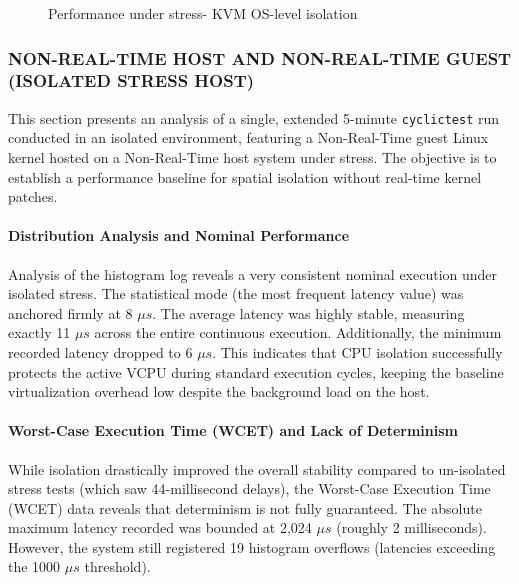 \begin{figure}
\centering

\caption{Performance under stress- KVM OS-level isolation}
\end{figure}

\subsubsection{NON-REAL-TIME HOST AND NON-REAL-TIME GUEST (ISOLATED
STRESS
HOST)}\label{non-real-time-host-and-non-real-time-guest-isolated-stress-host}

This section presents an analysis of a single, extended 5-minute
\texttt{cyclictest} run conducted in an isolated environment, featuring
a Non-Real-Time guest Linux kernel hosted on a Non-Real-Time host system
under stress. The objective is to establish a performance baseline for
spatial isolation without real-time kernel patches.

\paragraph{Distribution Analysis and Nominal
Performance}\label{distribution-analysis-and-nominal-performance-3}

Analysis of the histogram log reveals a very consistent nominal
execution under isolated stress. The statistical mode (the most frequent
latency value) was anchored firmly at 8 $\mu s$. The average latency was
highly stable, measuring exactly 11 $\mu s$ across the entire continuous
execution. Additionally, the minimum recorded latency dropped to 6 $\mu s$.
This indicates that CPU isolation successfully protects the active VCPU
during standard execution cycles, keeping the baseline virtualization
overhead low despite the background load on the host.

\paragraph{Worst-Case Execution Time (WCET) and Lack of
Determinism}\label{worst-case-execution-time-wcet-and-lack-of-determinism-2}

While isolation drastically improved the overall stability compared to
un-isolated stress tests (which saw 44-millisecond delays), the
Worst-Case Execution Time (WCET) data reveals that determinism is not
fully guaranteed. The absolute maximum latency recorded was bounded at
2,024 $\mu s$ (roughly 2 milliseconds). However, the system still registered
19 histogram overflows (latencies exceeding the 1000 $\mu s$ threshold).

